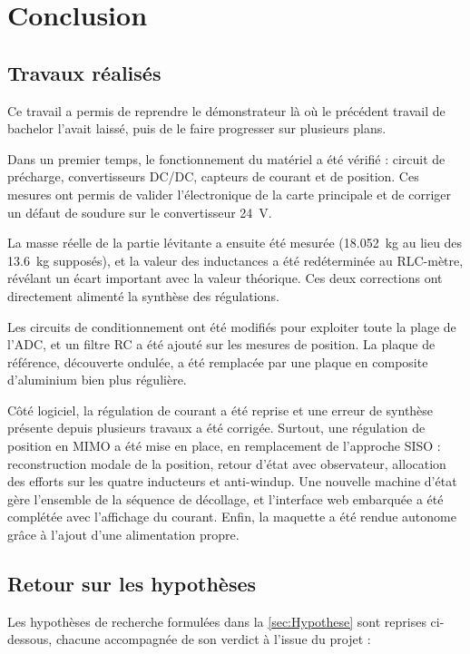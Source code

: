 \chapter{Conclusion}

\section{Travaux réalisés}
Ce travail a permis de reprendre le démonstrateur là où le précédent travail de bachelor l'avait laissé, puis de le faire progresser sur plusieurs plans.

Dans un premier temps, le fonctionnement du matériel a été vérifié : circuit de précharge, convertisseurs DC/DC, capteurs de courant et de position. Ces mesures ont permis de valider l'électronique de la carte principale et de corriger un défaut de soudure sur le convertisseur 24~V.

La masse réelle de la partie lévitante a ensuite été mesurée (18.052~kg au lieu des 13.6~kg supposés), et la valeur des inductances a été redéterminée au RLC-mètre, révélant un écart important avec la valeur théorique. Ces deux corrections ont directement alimenté la synthèse des régulations.

Les circuits de conditionnement ont été modifiés pour exploiter toute la plage de l'ADC, et un filtre RC a été ajouté sur les mesures de position. La plaque de référence, découverte ondulée, a été remplacée par une plaque en composite d'aluminium bien plus régulière.

Côté logiciel, la régulation de courant a été reprise et une erreur de synthèse présente depuis plusieurs travaux a été corrigée. Surtout, une régulation de position en MIMO a été mise en place, en remplacement de l'approche SISO : reconstruction modale de la position, retour d'état avec observateur, allocation des efforts sur les quatre inducteurs et anti-windup. Une nouvelle machine d'état gère l'ensemble de la séquence de décollage, et l'interface web embarquée a été complétée avec l'affichage du courant. Enfin, la maquette a été rendue autonome grâce à l'ajout d'une alimentation propre.

\section{Retour sur les hypothèses}
Les hypothèses de recherche formulées dans la \autoref{sec:Hypothese} sont reprises ci-dessous, chacune accompagnée de son verdict à l'issue du projet :

